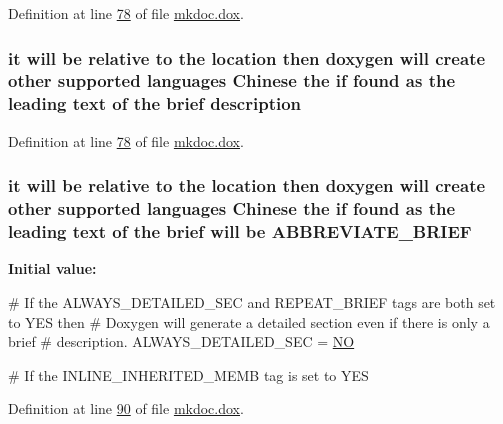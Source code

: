 Definition at line \hyperlink{mkdoc_8dox_source_l00078}{78} of file \hyperlink{mkdoc_8dox_source}{mkdoc.\-dox}.

\hypertarget{mkdoc_8dox_ae82208d022e4246ddf1e4f481a3f81b0}{
\subsubsection[{description}]{\setlength{\rightskip}{0pt plus 5cm}it will be relative to the location then doxygen will create other supported languages {\bf Chinese} the if found as the leading text of the brief description}}\label{mkdoc_8dox_ae82208d022e4246ddf1e4f481a3f81b0}


Definition at line \hyperlink{mkdoc_8dox_source_l00078}{78} of file \hyperlink{mkdoc_8dox_source}{mkdoc.\-dox}.

\hypertarget{mkdoc_8dox_a122d2428a3db9b3f12d65d76f35275b8}{
\subsubsection[{A\-B\-B\-R\-E\-V\-I\-A\-T\-E\-\_\-\-B\-R\-I\-E\-F}]{\setlength{\rightskip}{0pt plus 5cm}it will be relative to the location then doxygen will create other supported languages {\bf Chinese} the if found as the leading text of the brief will be A\-B\-B\-R\-E\-V\-I\-A\-T\-E\-\_\-\-B\-R\-I\-E\-F}}\label{mkdoc_8dox_a122d2428a3db9b3f12d65d76f35275b8}
{\bfseries Initial value\-:}
\begin{DoxyCode}
 

\textcolor{preprocessor}{# If the ALWAYS\_DETAILED\_SEC and REPEAT\_BRIEF tags are both set to YES then }
\textcolor{preprocessor}{}\textcolor{preprocessor}{# Doxygen will generate a detailed section even if there is only a brief }
\textcolor{preprocessor}{}\textcolor{preprocessor}{# description.}
\textcolor{preprocessor}{}
ALWAYS\_DETAILED\_SEC    = \hyperlink{mkdoc_8dox_a0f6a46245280dc38baf9600906aa1393}{NO}

\textcolor{preprocessor}{# If the INLINE\_INHERITED\_MEMB tag is set to YES}
\end{DoxyCode}


Definition at line \hyperlink{mkdoc_8dox_source_l00090}{90} of file \hyperlink{mkdoc_8dox_source}{mkdoc.\-dox}.

